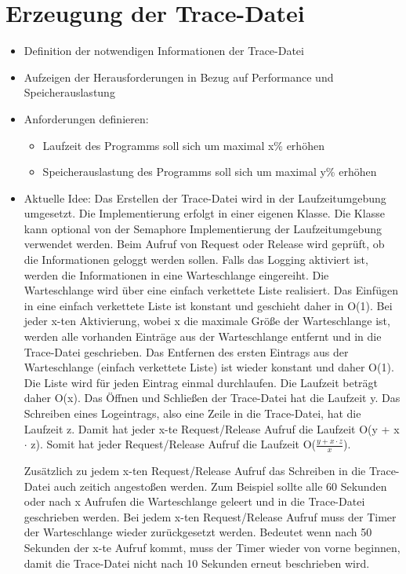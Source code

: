 \section{Erzeugung der Trace-Datei}
\label{section:Erzeugung der Trace-Datei}
\begin{itemize}
    \item Definition der notwendigen Informationen der Trace-Datei
    \item Aufzeigen der Herausforderungen in Bezug auf Performance und
    Speicherauslastung
  \item Anforderungen definieren:
  \begin{itemize}
    \item Laufzeit des Programms soll sich um maximal x\% erhöhen
    \item Speicherauslastung des Programms soll sich um maximal y\% erhöhen
  \end{itemize}
    \item Aktuelle Idee: Das Erstellen der Trace-Datei wird in der
    Laufzeitumgebung umgesetzt. Die Implementierung erfolgt in einer eigenen
    Klasse. Die Klasse kann optional von der Semaphore Implementierung der
    Laufzeitumgebung verwendet werden. Beim Aufruf von Request oder Release wird
    geprüft, ob die Informationen geloggt werden sollen. Falls das Logging
    aktiviert ist, werden die Informationen in eine Warteschlange eingereiht.
    Die Warteschlange wird über eine einfach verkettete Liste realisiert. Das
    Einfügen in eine einfach verkettete Liste ist konstant und geschieht daher
    in O(1). Bei jeder x-ten Aktivierung, wobei x die maximale Größe der
    Warteschlange ist, werden alle vorhanden Einträge aus der Warteschlange
    entfernt und in die Trace-Datei geschrieben. Das Entfernen des ersten
    Eintrags aus der Warteschlange (einfach verkettete Liste) ist wieder
    konstant und daher O(1). Die Liste wird für jeden Eintrag einmal
    durchlaufen. Die Laufzeit beträgt daher O(x). Das Öffnen und Schließen der
    Trace-Datei hat die Laufzeit y. Das Schreiben eines Logeintrags, also eine
    Zeile in die Trace-Datei, hat die Laufzeit z. Damit hat jeder x-te
    Request/Release Aufruf die Laufzeit O(y + x $\cdot$ z). Somit hat jeder
    Request/Release Aufruf die Laufzeit O($\frac{y + x \cdot z}{x}$).

    Zusätzlich zu jedem x-ten Request/Release Aufruf das Schreiben in die
    Trace-Datei auch zeitich angestoßen werden. Zum Beispiel sollte alle 60
    Sekunden oder nach x Aufrufen die Warteschlange geleert und in die
    Trace-Datei geschrieben werden. Bei jedem x-ten Request/Release Aufruf muss
    der Timer der Warteschlange wieder zurückgesetzt werden. Bedeutet wenn nach
    50 Sekunden der x-te Aufruf kommt, muss der Timer wieder von vorne beginnen,
    damit die Trace-Datei nicht nach 10 Sekunden erneut beschrieben wird.


\end{itemize}
